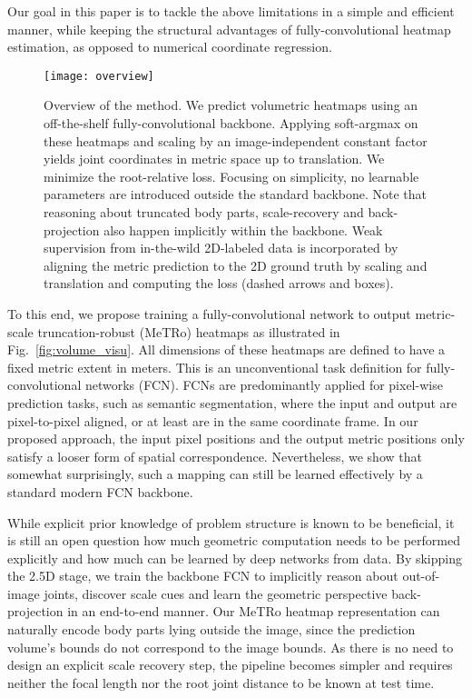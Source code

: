 Our goal in this paper is to tackle the above limitations in a simple and efficient manner, while keeping the structural advantages of fully-convolutional heatmap estimation, as opposed to numerical coordinate regression.
\begin{figure*}[t]
\centering
\texttt{[image: overview]} \\
\caption{Overview of the method.
We predict volumetric heatmaps using an off-the-shelf fully-convolutional backbone.
Applying soft-argmax on these heatmaps and scaling by an image-independent constant factor yields joint coordinates in metric space up to translation.
We minimize the root-relative  loss.
Focusing on simplicity, no learnable parameters are introduced outside the standard backbone.
Note that reasoning about truncated body parts, scale-recovery and back-projection also happen implicitly within the backbone.
Weak supervision from in-the-wild 2D-labeled data is incorporated by aligning the metric prediction to the 2D ground truth by scaling and translation and computing the  loss (dashed arrows and boxes).}
\label{fig:overview}
\end{figure*}
To this end, we propose training a fully-convolutional network to output metric-scale truncation-robust (MeTRo) heatmaps as illustrated in Fig.~\ref{fig:volume_visu}.
All dimensions of these heatmaps are defined to have a fixed metric extent in meters.
This is an unconventional task definition for fully-convolutional networks (FCN).
FCNs are predominantly applied for pixel-wise prediction tasks, such as semantic segmentation, where the input and output are pixel-to-pixel aligned, or at least are in the same coordinate frame.
In our proposed approach, the input pixel positions and the output metric positions only satisfy a looser form of spatial correspondence.
Nevertheless, we show that somewhat surprisingly, such a mapping can still be learned effectively by a standard modern FCN backbone.

While explicit prior knowledge of problem structure is known to be beneficial, it is still an open question how much geometric computation needs to be performed explicitly and how much can be learned by deep networks from data.
By skipping the 2.5D stage, we train the backbone FCN to implicitly reason about out-of-image joints, discover scale cues and learn the geometric perspective back-projection in an end-to-end manner.
Our MeTRo heatmap representation can naturally encode body parts lying outside the image, since the prediction volume's bounds do not correspond to the image bounds.
As there is no need to design an explicit scale recovery step, the pipeline becomes simpler and requires neither the focal length nor the root joint distance to be known at test time.

